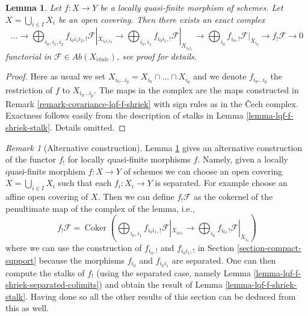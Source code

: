 \documentclass{stacks-project}
\theoremstyle{plain}
\newtheorem{lemma}[subsection]{Lemma}
\theoremstyle{definition}
\theoremstyle{remark}
\newtheorem{remark}[subsection]{Remark}
\numberwithin{equation}{subsection}
\def\etale{{\acute{e}tale}}
\def\Coker{\mathop{\mathrm{Coker}}}
\begin{document}
\begin{lemma}
\label{lemma-lqf-colimit-f-shriek}
Let $f : X \to Y$ be a locally quasi-finite morphism of schemes.
Let $X = \bigcup_{i \in I} X_i$ be an open covering. Then there
exists an exact complex
$$
\ldots \to
\bigoplus\nolimits_{i_0, i_1, i_2} f_{i_0i_1i_2, !}
\mathcal{F}|_{X_{i_0i_1i_2}} \to
\bigoplus\nolimits_{i_0, i_1} f_{i_0i_1, !} \mathcal{F}|_{X_{i_0i_1}} \to
\bigoplus\nolimits_{i_0} f_{i_0, !} \mathcal{F}|_{X_{i_0}}
\to f_!\mathcal{F} \to 0
$$
functorial in $\mathcal{F} \in \textit{Ab}(X_\etale)$, see
proof for details.
\end{lemma}

\begin{proof}
Here as usual we set $X_{i_0 \ldots i_p} = X_{i_0} \cap \ldots \cap X_{i_p}$
and we denote $f_{i_0 \ldots i_p}$ the restriction of $f$ to
$X_{i_0 \ldots i_p}$. The maps in the complex are the maps
constructed in Remark \ref{remark-covariance-lqf-f-shriek}
with sign rules as in the {\v C}ech complex.
Exactness follows easily from the description of stalks in
Lemma \ref{lemma-lqf-f-shriek-stalk}. Details omitted.
\end{proof}

\begin{remark}[Alternative construction]
\label{remark-alternative-lqf-f-shriek}
Lemma \ref{lemma-lqf-colimit-f-shriek}
gives an alternative construction of the functor $f_!$
for locally quasi-finite morphisms $f$.
Namely, given a locally quasi-finite morphism $f : X \to Y$ of schemes
we can choose an open covering $X = \bigcup_{i \in I} X_i$
such that each $f_i : X_i \to Y$ is separated. For example choose
an affine open covering of $X$. Then we
can define $f_!\mathcal{F}$ as the cokernel of the penultimate map
of the complex of the lemma, i.e.,
$$
f_!\mathcal{F} = \Coker\left(
\bigoplus\nolimits_{i_0, i_1} f_{i_0i_1, !} \mathcal{F}|_{X_{i_0i_1}} \to
\bigoplus\nolimits_{i_0} f_{i_0, !} \mathcal{F}|_{X_{i_0}}
\right)
$$
where we can use the construction of $f_{i_0, !}$ and
$f_{i_0i_1, !}$ in Section \ref{section-compact-support}
because the morphisms $f_{i_0}$ and $f_{i_0 i_1}$ are separated.
One can then compute the stalks of $f_!$ (using the separated
case, namely Lemma \ref{lemma-lqf-f-shriek-separated-colimits})
and obtain the result of Lemma \ref{lemma-lqf-f-shriek-stalk}.
Having done so all the other results of this section can be
deduced from this as well.
\end{remark}
\end{document}
